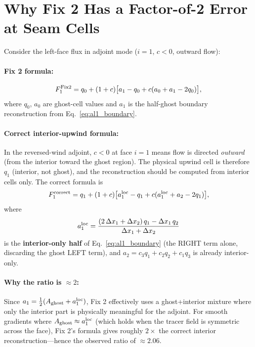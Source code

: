 \documentclass[11pt]{article}
\begin{document}
\section{Why Fix 2 Has a Factor-of-2 Error at Seam Cells}

Consider the left-face flux in adjoint mode ($i=1$, $c < 0$, outward flow):

\paragraph{Fix 2 formula:}
\begin{equation}
  F_1^{\rm Fix2} = q_0 + (1+c)\bigl[a_1 - q_0 + c(a_0 + a_1 - 2q_0)\bigr],
  \label{eq:fix2_left}
\end{equation}
where $q_0$, $a_0$ are ghost-cell values and $a_1$ is the half-ghost
boundary reconstruction from Eq.~\eqref{eq:al1_boundary}.

\paragraph{Correct interior-upwind formula:}
In the reversed-wind adjoint, $c < 0$ at face $i=1$ means flow is directed
\emph{outward} (from the interior toward the ghost region). The physical
upwind cell is therefore $q_1$ (interior, not ghost), and the reconstruction
should be computed from interior cells only. The correct formula is
\begin{equation}
  F_1^{\rm correct} = q_1 + (1+c)\bigl[a_1^{\rm loc} - q_1 +
    c(a_1^{\rm loc} + a_2 - 2q_1)\bigr],
  \label{eq:fix3_left}
\end{equation}
where
\begin{equation}
  a_1^{\rm loc} = \frac{(2\,\Delta x_1 + \Delta x_2)\,q_1 - \Delta x_1\,q_2}
                       {\Delta x_1 + \Delta x_2}
  \label{eq:al_loc_left}
\end{equation}
is the \textbf{interior-only half} of Eq.~\eqref{eq:al1_boundary} (the RIGHT
term alone, discarding the ghost LEFT term), and $a_2 = c_3 q_1 + c_2 q_2 +
c_1 q_3$ is already interior-only.

\paragraph{Why the ratio is $\approx 2$:}
Since $a_1 = \tfrac{1}{2}(A_{\rm ghost} + a_1^{\rm loc})$, Fix 2 effectively
uses a ghost+interior mixture where only the interior part is physically
meaningful for the adjoint. For smooth gradients where $A_{\rm ghost} \approx
a_1^{\rm loc}$ (which holds when the tracer field is symmetric across the
face), Fix 2's formula gives roughly $2 \times$ the correct interior
reconstruction---hence the observed ratio of $\approx 2.06$.
\end{document}
